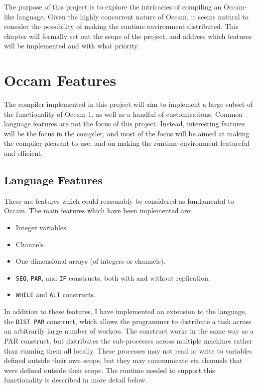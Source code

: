 The purpose of this project is to explore the intricacies of compiling an
Occam-like language. Given the highly concurrent nature of Occam, it seems
natural to consider the possibility of making the runtime environment
distributed. This chapter will formally set out the scope of the project, and
address which features will be implemented and with what priority.

\section{Occam Features}

The compiler implemented in this project will aim to implement a large subset of
the functionality of Occam 1, as well as a handful of customisations. Common
language features are not the focus of this project. Instead, interesting
features will be the focus in the compiler, and most of the focus will be aimed
at making the compiler pleasant to use, and on making the runtime environment
featureful and efficient.

\subsection{Language Features}

These are features which could reasonably be considered as fundamental to Occam.
The main features which have been implemented are:
\begin{itemize}
  \item Integer variables.
  \item Channels.
  \item One-dimensional arrays (of integers or channels).
  \item \texttt{SEQ}, \texttt{PAR}, and \texttt{IF} constructs, both with and
        without replication.
  \item \texttt{WHILE} and \texttt{ALT} constructs.
\end{itemize}

In addition to these features, I have implemented an extension to the language,
the \texttt{DIST PAR} construct, which allows the programmer to distribute
a task across an arbitrarily large number of workers. The construct works in the
same way as a PAR construct, but distributes the sub-processes across multiple
machines rather than running them all locally. These processes may not read or
write to variables defined outside their own scope, but they may communicate via
channels that were defined outside their scope. The runtime needed to support
this functionality is described in more detail below.

